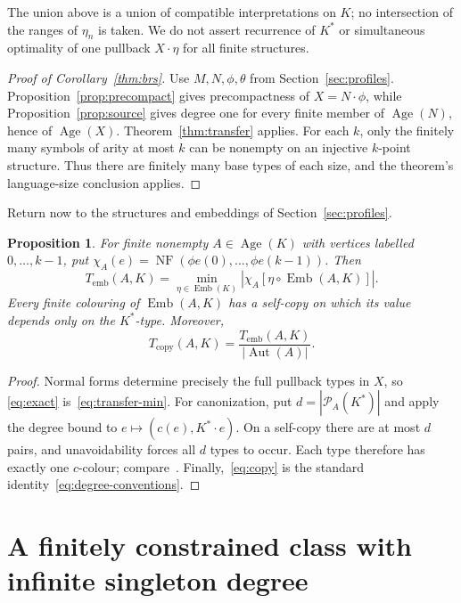 \documentclass{article}
\numberwithin{equation}{section}
\newtheorem{proposition}[theorem]{Proposition}
\theoremstyle{definition}
\DeclareMathOperator{\Emb}{Emb}
\DeclareMathOperator{\Age}{Age}
\DeclareMathOperator{\Aut}{Aut}
\DeclareMathOperator{\NF}{NF}
\newcommand{\brd}{T_{\mathrm{emb}}}
\newcommand{\crd}{T_{\mathrm{copy}}}
\begin{document}
The union above is a union of compatible interpretations on $K$;
no intersection of the ranges of $\eta_n$ is taken. We do not assert
recurrence of $K^*$ or simultaneous optimality of one pullback
$X\cdot\eta$ for all finite structures.

\begin{proof}[Proof of Corollary~\ref{thm:brs}]
Use $M,N,\phi,\theta$ from Section~\ref{sec:profiles}.
Proposition~\ref{prop:precompact} gives precompactness of
$X=N\cdot\phi$, while Proposition~\ref{prop:source} gives degree one
for every finite member of $\Age(N)$, hence of $\Age(X)$.
Theorem~\ref{thm:transfer} applies. For each $k$, only the finitely
many symbols of arity at most $k$ can be nonempty on an injective
$k$-point structure. Thus there are finitely many base types of each
size, and the theorem's language-size conclusion applies.
\end{proof}

Return now to the structures and embeddings of Section~\ref{sec:profiles}.

\begin{proposition}\label{prop:degrees}
For finite nonempty $A\in\Age(K)$ with vertices labelled
$0,\ldots,k-1$, put
$\chi_A(e)=\NF(\phi e(0),\ldots,\phi e(k-1))$. Then
\begin{equation}\label{eq:exact}
\brd(A,K)=\min_{\eta\in\Emb(K)}
|\chi_A[\eta\circ\Emb(A,K)]|.
\end{equation}
Every finite colouring of $\Emb(A,K)$ has a self-copy on which its
value depends only on the $K^*$-type. Moreover,
\begin{equation}\label{eq:copy}
\crd(A,K)=\frac{\brd(A,K)}{|\Aut(A)|}.
\end{equation}
\end{proposition}

\begin{proof}
Normal forms determine precisely the full pullback types in $X$, so
\eqref{eq:exact} is~\eqref{eq:transfer-min}. For canonization, put
$d=|\mathcal P_A(K^*)|$ and apply the degree bound to
$e\mapsto(c(e),K^*\cdot e)$. On a self-copy there are at most $d$
pairs, and unavoidability forces all $d$ types to occur. Each type
therefore has exactly one $c$-colour; compare~\cite[Proposition~3.8]{HZ}.
Finally,~\eqref{eq:copy} is the standard
identity~\eqref{eq:degree-conventions}.
\end{proof}
\section{A finitely constrained class with infinite singleton degree}
\label{neg:section}
\end{document}
